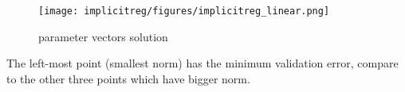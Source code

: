 \begin{answer}
\begin{figure}[H]
  \centering
  \texttt{[image: implicitreg/figures/implicitreg\_linear.png]}
  \caption{parameter vectors solution}
\end{figure}
The left-most point (smallest norm) has the minimum validation error, compare to the other three points which have bigger norm.
\end{answer}